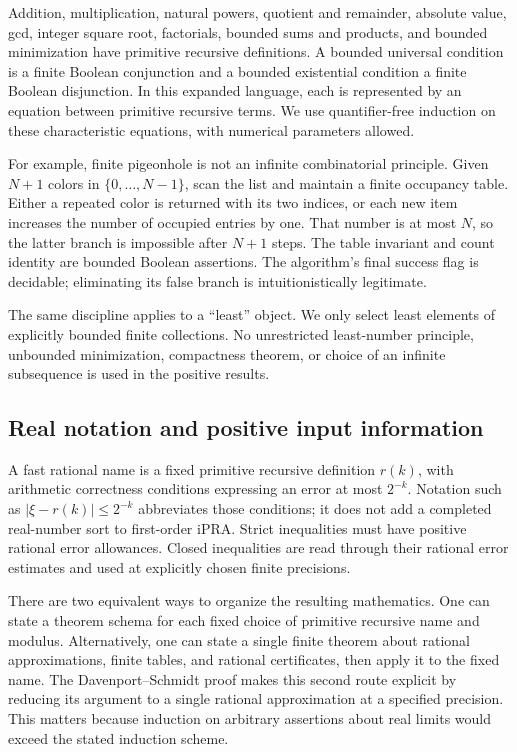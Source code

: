 Addition, multiplication, natural powers, quotient and remainder, absolute
value, gcd, integer square root, factorials, bounded sums and products,
and bounded minimization have primitive recursive definitions.  A bounded
universal condition is a finite Boolean conjunction and a bounded existential
condition a finite Boolean disjunction.  In this expanded language, each is
represented by an equation between primitive recursive terms.  We use
quantifier-free induction on these characteristic equations, with numerical
parameters allowed.

For example, finite pigeonhole is not an infinite combinatorial principle.
Given $N+1$ colors in $\{0,\ldots,N-1\}$, scan the list and maintain a finite
occupancy table.  Either a repeated color is returned with its two indices,
or each new item increases the number of occupied entries by one.  That number
is at most $N$, so the latter branch is impossible after $N+1$ steps.  The
table invariant and count identity are bounded Boolean assertions.  The
algorithm's final success flag is decidable; eliminating its false branch is
intuitionistically legitimate.

The same discipline applies to a ``least'' object.  We only select least
elements of explicitly bounded finite collections.  No unrestricted
least-number principle, unbounded minimization, compactness theorem, or
choice of an infinite subsequence is used in the positive results.

\subsection{Real notation and positive input information}

A fast rational name is a fixed primitive recursive definition $r(k)$,
with arithmetic correctness conditions expressing an error at most $2^{-k}$.
Notation such as $|\xi-r(k)|\leq2^{-k}$ abbreviates those conditions; it does
not add a completed real-number sort to first-order iPRA.  Strict inequalities
must have positive rational error allowances.  Closed inequalities are read
through their rational error estimates and used at explicitly chosen finite
precisions.

There are two equivalent ways to organize the resulting mathematics.  One
can state a theorem schema for each fixed choice of primitive recursive name
and modulus.  Alternatively, one can state a single finite theorem about
rational approximations, finite tables, and rational certificates, then apply
it to the fixed name.  The Davenport--Schmidt proof makes this second route
explicit by reducing its argument to a single rational approximation at a
specified precision.  This matters because induction on arbitrary assertions
about real limits would exceed the stated induction scheme.

